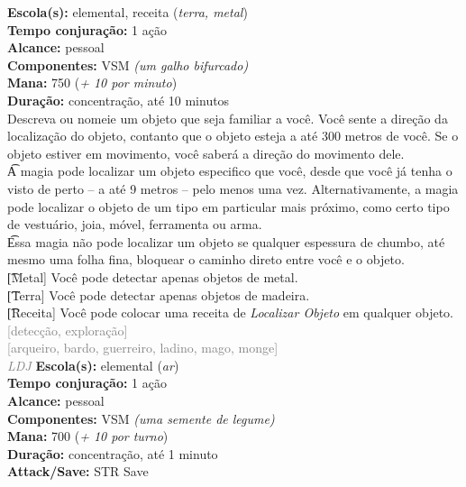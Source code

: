 \documentclass{RPG_Adventure}[2021/10/20]
\begin{document}
{\small \t \textbf{Escola(s):} elemental, receita (\textit{terra, metal})\\\t \textbf{Tempo conjuração:} 1 ação\\\t \textbf{Alcance:} pessoal\\\t \textbf{Componentes:} VSM \textit{(um galho bifurcado)}\\\t \textbf{Mana:} 750 (\textit{+ 10 por minuto})\\\t \textbf{Duração:} concentração, até 10 minutos\\}
{\normalsize Descreva ou nomeie um objeto que seja familiar a você. Você sente a direção da localização do objeto, contanto que o objeto esteja a até 300 metros de você. Se o objeto estiver em movimento, você saberá a direção do movimento dele.\\\t A magia pode localizar um objeto especifico que você, desde que você já tenha o visto de perto – a até 9 metros – pelo menos uma vez. Alternativamente, a magia pode localizar o objeto de um tipo em particular mais próximo, como certo tipo de vestuário, joia, móvel, ferramenta ou arma.\\\t Essa magia não pode localizar um objeto se qualquer espessura de chumbo, até mesmo uma folha fina, bloquear o caminho direto entre você e o objeto.\\\t [Metal] Você pode detectar apenas objetos de metal.\\\t [Terra] Você pode detectar apenas objetos de madeira.\\\t [Receita] Você pode colocar uma receita de \textit{Localizar Objeto} em qualquer objeto.\\}
{\scriptsize \textcolor{gray}{[detecção, exploração]\\}}
{\scriptsize \textcolor{gray}{[arqueiro, bardo, guerreiro, ladino, mago, monge]\\}}
{\tiny \textcolor{gray}{\textit{LDJ}}}\jump{}
{\small \t \textbf{Escola(s):} elemental (\textit{ar})\\\t \textbf{Tempo conjuração:} 1 ação\\\t \textbf{Alcance:} pessoal\\\t \textbf{Componentes:} VSM \textit{(uma semente de legume)}\\\t \textbf{Mana:} 700 (\textit{+ 10 por turno})\\\t \textbf{Duração:} concentração, até 1 minuto\\\t \textbf{Attack/Save:} STR Save\\}
\end{document}
